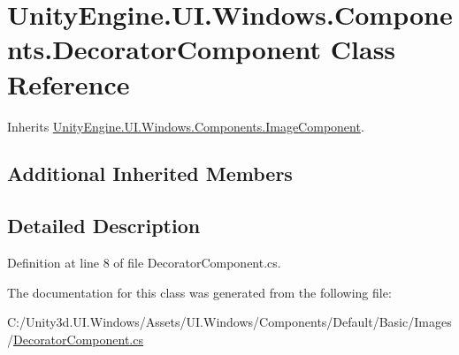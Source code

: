 \hypertarget{class_unity_engine_1_1_u_i_1_1_windows_1_1_components_1_1_decorator_component}{}\section{Unity\+Engine.\+U\+I.\+Windows.\+Components.\+Decorator\+Component Class Reference}
\label{class_unity_engine_1_1_u_i_1_1_windows_1_1_components_1_1_decorator_component}


Inherits \hyperlink{class_unity_engine_1_1_u_i_1_1_windows_1_1_components_1_1_image_component}{Unity\+Engine.\+U\+I.\+Windows.\+Components.\+Image\+Component}.

\subsection*{Additional Inherited Members}


\subsection{Detailed Description}


Definition at line 8 of file Decorator\+Component.\+cs.



The documentation for this class was generated from the following file\+:\begin{DoxyCompactItemize}
\item 
C\+:/\+Unity3d.\+U\+I.\+Windows/\+Assets/\+U\+I.\+Windows/\+Components/\+Default/\+Basic/\+Images/\hyperlink{_decorator_component_8cs}{Decorator\+Component.\+cs}\end{DoxyCompactItemize}
